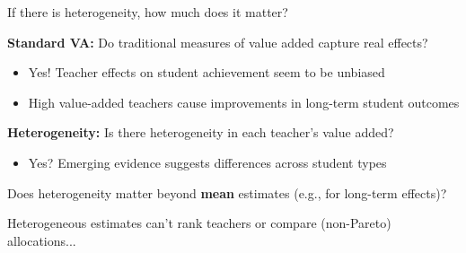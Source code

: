 \documentclass[t,aspectratio=169,11pt]{beamer}
\begin{document}

\begin{frame}{If there is heterogeneity, how much does it matter?}

    \vfill
    \begin{wideitemize}
        \item \textbf{Standard VA:} Do traditional measures of value added capture real effects?
            \begin{itemize}
                \item<2-> Yes! Teacher effects on student achievement seem to be unbiased
                
                {\tiny \color{gray}\citep[e.g.,][etc.]{chetty2014measuring1,Koedel2015}}
                
                \item<3-> High value-added teachers cause improvements in long-term student outcomes
                
                {\tiny \color{gray}\citep[e.g.,][]{chetty2014measuring2,pope2017multidimensional}}
            \end{itemize}
        
        \item<4-> \textbf{Heterogeneity:} Is there heterogeneity in each teacher's value added?
            \begin{itemize}
                \item<5-> Yes? Emerging evidence suggests differences across student types
            
                {\tiny \color{gray} \citep[e.g.,][]{lockwood2009,condie2014teacher,pope2017multidimensional,Delgado2020,bates2022teacher}}
            \end{itemize}
    
        \item<6-> Does heterogeneity matter beyond {\color{ptr3}\textbf{mean}} estimates (e.g., for long-term effects)? 
            
        \item<7-> Heterogeneous estimates can't rank teachers or compare (non-Pareto) allocations... 
    \end{wideitemize}
    \vfill
    
\end{frame}
\end{document}
